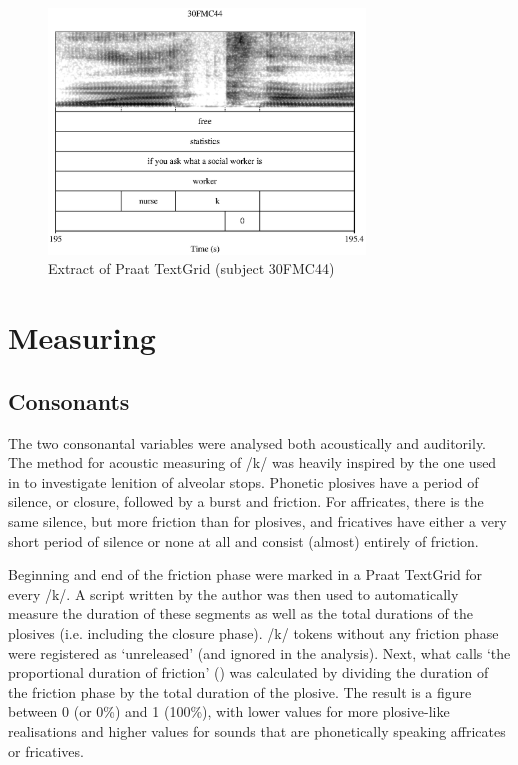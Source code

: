 	\begin{figure}[h]
		\centering
			\centering
			\includegraphics[width=0.75\textwidth]{figures/TextGrid_screenshot}
		\caption{Extract of Praat TextGrid (subject 30FMC44)}
		\label{fig.textgrid.ex}
	\end{figure}

	\section{Measuring}\label{sec.prod_method.measuring}

		\subsection{Consonants}\label{sec.prod_method.con}

The two consonantal variables were analysed both acoustically and auditorily.
The method for acoustic measuring of /k/ was heavily inspired by the one used in \citealt{sangster2001} to investigate lenition of alveolar stops. Phonetic plosives have a period of silence, or closure, followed by a burst and friction. For affricates, there is the same silence, but more friction than for plosives, and fricatives have either a very short period of silence or none at all and consist (almost) entirely of friction. 

Beginning and end of the friction phase were marked in a Praat TextGrid for every /k/. 
A script written by the author was then used to automatically measure the duration of these segments as well as the total durations of the plosives (i.e. including the closure phase).
/k/ tokens without any friction phase were registered as `unreleased' (and ignored in the analysis).
Next, what \citeauthor{sangster2001} calls `the proportional duration of friction' () was calculated by dividing the duration of the friction phase by the total duration of the plosive. The result is a figure between 0 (or 0\%) and 1 (100\%), with lower values for more plosive-like realisations and higher values for sounds that are phonetically speaking affricates or fricatives.

